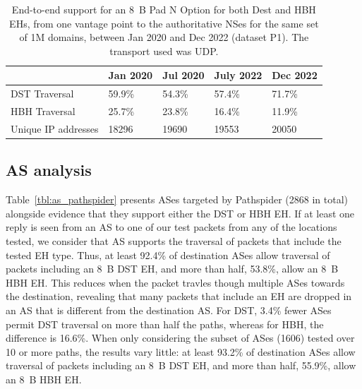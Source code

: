 \documentclass[conference]{IEEEtran}
\begin{document}
\begin{table}
\begin{tabular}{l|l|l|l|l}
                    & Jan 2020 & Jul 2020 & July 2022 & Dec 2022 \\
\hline
DST Traversal& 59.9\%   & 54.3\%   & 57.4\%    & 71.7\%   \\
HBH Traversal & 25.7\%   & 23.8\%   & 16.4\%    & 11.9\%   \\
\hline
Unique IP addresses & 18296    & 19690    & 19553     & 20050   
\end{tabular}
\label{tbl:longitudinal_support}
\caption{End-to-end support for an 8~B Pad N Option for both Dest and HBH EHs, from one vantage point to the authoritative NSes for the same set of 1M domains, between Jan 2020 and Dec 2022 (dataset P1). The transport used was UDP.}
\end{table}

\subsection{AS analysis}

Table~\ref{tbl:as_pathspider} presents ASes targeted by Pathspider (2868 in total) alongside evidence that they support either the DST or HBH EH.
If at least one reply is seen from an AS to one of our test packets from any of the locations tested, we consider that AS supports the traversal of packets that include the tested EH type. Thus, at least 92.4\% of destination ASes allow traversal of packets including an 8~B DST EH, and more than half, 53.8\%, allow an 8~B HBH EH. This  reduces when the packet travles though multiple ASes towards the destination, revealing that many packets that include an EH are dropped in an AS that is different from the destination AS. For DST, 3.4\% fewer ASes permit DST traversal on more than half the paths, whereas for HBH, the difference is 16.6\%.
When only considering the subset of ASes (1606) tested over 10 or more paths, the results vary little: at least 93.2\% of destination ASes allow traversal of packets including an 8~B DST EH, and more than half, 55.9\%, allow an 8~B HBH EH.
\end{document}
